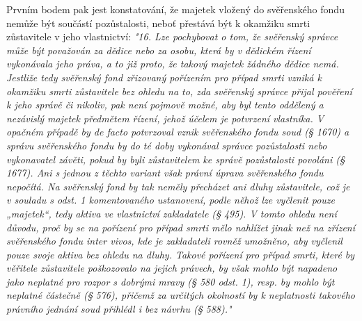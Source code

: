 \documentclass{article}
\begin{document}
 Prvním bodem pak jest konstatování, že majetek vložený do svěřenského fondu nemůže být součástí pozůstalosti, neboť přestává být k okamžiku smrti zůstavitele v jeho vlastnictví: \textit{"16. Lze pochybovat o tom, že svěřenský správce může být považován za dědice nebo za osobu, která by v dědickém řízení vykonávala jeho práva, a to již proto, že takový majetek žádného dědice nemá. Jestliže tedy svěřenský fond zřizovaný pořízením pro případ smrti vzniká k okamžiku smrti zůstavitele bez ohledu na to, zda svěřenský správce přijal pověření k jeho správě či nikoliv, pak není pojmově možné, aby byl tento oddělený a nezávislý majetek předmětem řízení, jehož účelem je potvrzení vlastníka. V opačném případě by de facto potvrzoval vznik svěřenského fondu soud (§ 1670) a správu svěřenského fondu by do té doby vykonával správce pozůstalosti nebo vykonavatel závěti, pokud by byli zůstavitelem ke správě pozůstalosti povoláni (§ 1677). Ani s jednou z těchto variant však právní úprava svěřenského fondu nepočítá. Na svěřenský fond by tak neměly přecházet ani dluhy zůstavitele, což je v souladu s odst. 1 komentovaného ustanovení, podle něhož lze vyčlenit pouze „majetek“, tedy aktiva ve vlastnictví zakladatele (§ 495). V tomto ohledu není důvodu, proč by se na pořízení pro případ smrti mělo nahlížet jinak než na zřízení svěřenského fondu inter vivos, kde je zakladateli rovněž umožněno, aby vyčlenil pouze svoje aktiva bez ohledu na dluhy. Takové pořízení pro případ smrti, které by věřitele zůstavitele poškozovalo na jejich právech, by však mohlo být napadeno jako neplatné pro rozpor s dobrými mravy (§ 580 odst. 1), resp. by mohlo být neplatné částečně (§ 576), přičemž za určitých okolností by k neplatnosti takového právního jednání soud přihlédl i bez návrhu (§ 588)."}\\
 
\end{document}
